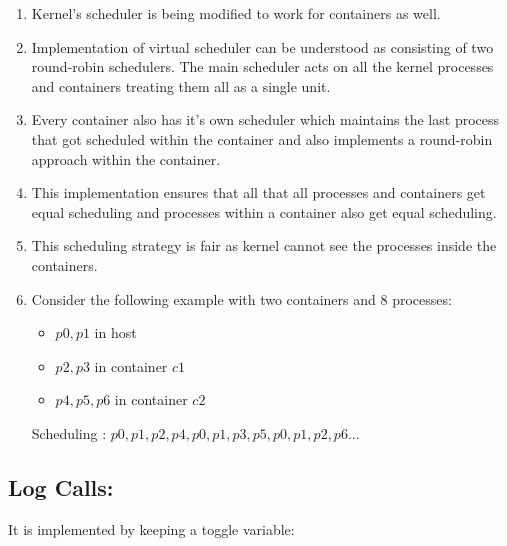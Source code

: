 \begin{enumerate}
    \item Kernel's scheduler is being modified to work for containers as well.
    \item Implementation of virtual scheduler can be understood as consisting of two round-robin schedulers. The main scheduler acts on all the kernel processes and containers treating them all as a single unit. 
    \item Every container also has it's own scheduler which maintains the last process that got scheduled within the container and also implements a round-robin approach within the container.
    \item This implementation ensures that all that all processes and containers get equal scheduling and processes within a container also get equal scheduling.
    \item This scheduling strategy is fair as kernel cannot see the processes inside the containers.
    \item Consider the following example with two containers and 8 processes:
    \begin{itemize}
        \item $p0,p1$ in host
        \item $p2,p3$ in container $c1$
        \item $p4,p5,p6$ in container $c2$
    \end{itemize}
    Scheduling : $p0, p1, p2, p4, p0, p1, p3, p5, p0, p1, p2, p6 ...$
\end{enumerate}

\subsection*{Log Calls:}

It is implemented by keeping a toggle variable:
